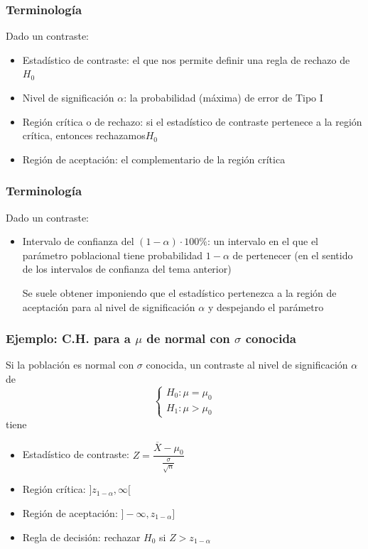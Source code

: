\documentclass[12pt,t]{beamer}\usepackage[]{graphicx}\usepackage[]{color}
\renewcommand{\emph}[1]{{\color{red}#1}}
\theoremstyle{plain}
\theoremstyle{definition}
\begin{document}
\begin{frame}
\frametitle{Terminología}
Dado un contraste:
\medskip

\begin{itemize}
\item \emph{Estadístico de contraste}: el que
nos permite definir una regla de rechazo de $H_{0}$
\medskip

\item \emph{Nivel de significación $\alpha$}:  la probabilidad (máxima) de error de Tipo I
\medskip


\item \emph{Región crítica o de rechazo}:
si el estadístico de contraste pertenece a la región crítica, entonces rechazamos$H_{0}$
\medskip

\item \emph{Región de aceptación}:  el complementario de la región
crítica
\end{itemize}

\end{frame}

\begin{frame}
\frametitle{Terminología}
Dado un contraste:
\medskip

\begin{itemize}

\item \emph{Intervalo de confianza del $(1-\alpha)\cdot 100\%$}:  un intervalo  en el que el parámetro poblacional tiene probabilidad $1-\alpha$ de pertenecer (en el sentido de los intervalos de confianza del tema anterior)\\
\medskip

Se suele obtener imponiendo que el estadístico pertenezca a la región de aceptación para al nivel de significación   $\alpha$ y despejando el parámetro


\end{itemize}

\end{frame}

\begin{frame}
\frametitle{Ejemplo: C.H. para a $\mu$ de normal con $\sigma$ conocida}

Si la población es normal con $\sigma$ conocida,  un contraste    al nivel   de significación   $\alpha$ de
$$
\left\{\begin{array}{l}
H_{0}:\mu=\mu_{0}\\ H_{1}:\mu>\mu_{0}
\end{array}
\right.
$$
tiene 
\begin{itemize}
\item \emph{Estadístico de contraste}: $Z=
\dfrac{\overline{X}-\mu_{0}}{\frac{\sigma}{\sqrt{n}}}$
\medskip

\item \emph{Región crítica}: $]z_{1-\alpha},\infty[$
\medskip

\item \emph{Región de aceptación}: $]-\infty,z_{1-\alpha}]$
\medskip

\item \emph{Regla de decisión}:
rechazar   $H_{0}$ si
$Z>z_{1-\alpha}$
\end{itemize}
\end{frame}
\end{document}
